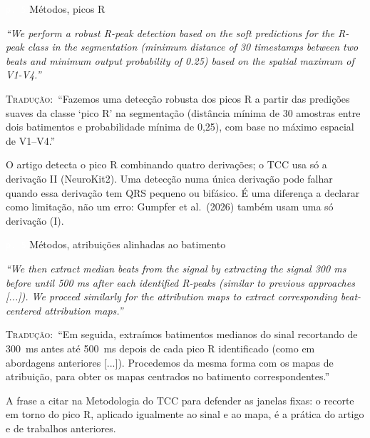 \documentclass[11pt,a4paper]{article}
\newcommand{\pagechip}[1]{{\setlength{\fboxsep}{1.5pt}\colorbox{cAcc}{\textcolor{white}{\scriptsize\texttt{#1}}}}}
\newenvironment{origquote}{\par\itshape\small}{\par}
\newenvironment{tradquote}{\par\small\textsc{Tradução:}\ }{\par}
\newcommand{\explab}[1]{\par\smallskip{\small\color{cAcc}\textbf{\MakeUppercase{#1}}}\par}
\begin{document}
\begin{citacard}{\pagechip{p. 5} Métodos, picos R}
\begin{origquote}“We perform a robust R-peak detection based on the soft predictions for the R-peak class in the segmentation (minimum distance of 30 timestamps between two beats and minimum output probability of 0.25) based on the spatial maximum of V1-V4.”\end{origquote}
\begin{tradquote}“Fazemos uma detecção robusta dos picos R a partir das predições suaves da classe ‘pico R’ na segmentação (distância mínima de 30 amostras entre dois batimentos e probabilidade mínima de 0,25), com base no máximo espacial de V1--V4.”\end{tradquote}
\explab{Explicação}
O artigo detecta o pico R combinando quatro derivações; o TCC usa só a derivação II (NeuroKit2). Uma detecção numa única derivação pode falhar quando essa derivação tem QRS pequeno ou bifásico. É uma diferença a declarar como limitação, não um erro: Gumpfer et al.\ (2026) também usam uma só derivação (I).
\end{citacard}

\begin{citacard}{\pagechip{p. 5} Métodos, atribuições alinhadas ao batimento}
\begin{origquote}“We then extract median beats from the signal by extracting the signal 300 ms before until 500 ms after each identified R-peaks (similar to previous approaches [...]). We proceed similarly for the attribution maps to extract corresponding beat-centered attribution maps.”\end{origquote}
\begin{tradquote}“Em seguida, extraímos batimentos medianos do sinal recortando de 300~ms antes até 500~ms depois de cada pico R identificado (como em abordagens anteriores [...]). Procedemos da mesma forma com os mapas de atribuição, para obter os mapas centrados no batimento correspondentes.”\end{tradquote}
\explab{Explicação}
A frase a citar na Metodologia do TCC para defender as janelas fixas: o recorte em torno do pico R, aplicado igualmente ao sinal e ao mapa, é a prática do artigo e de trabalhos anteriores.
\end{citacard}
\end{document}
